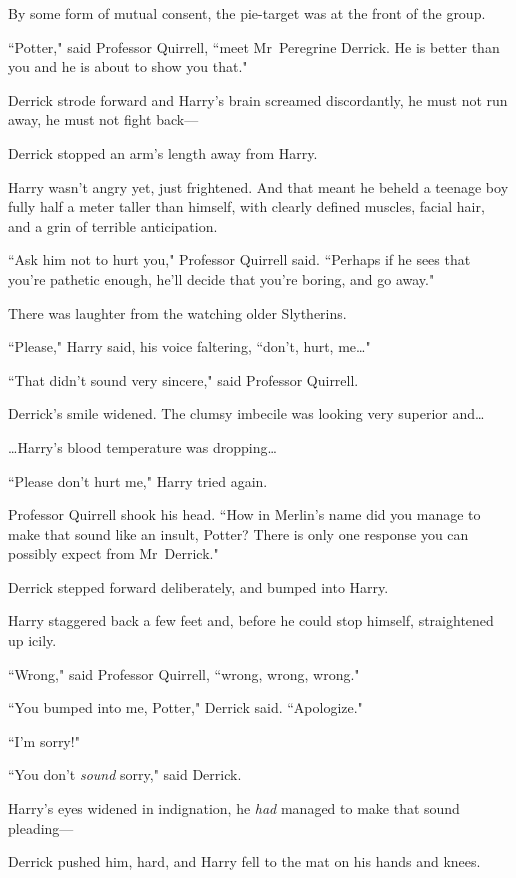 By some form of mutual consent, the pie-target was at the front of the group.

``Potter," said Professor Quirrell, ``meet Mr~Peregrine Derrick. He is better than you and he is about to show you that."

Derrick strode forward and Harry's brain screamed discordantly, he must not run away, he must not fight back—

Derrick stopped an arm's length away from Harry.

Harry wasn't angry yet, just frightened. And that meant he beheld a teenage boy fully half a meter taller than himself, with clearly defined muscles, facial hair, and a grin of terrible anticipation.

``Ask him not to hurt you," Professor Quirrell said. ``Perhaps if he sees that you're pathetic enough, he'll decide that you're boring, and go away."

There was laughter from the watching older Slytherins.

``Please," Harry said, his voice faltering, ``don't, hurt, me{\ldots}"

``That didn't sound very sincere," said Professor Quirrell.

Derrick's smile widened. The clumsy imbecile was looking very superior and{\ldots}

{\ldots}Harry's blood temperature was dropping{\ldots}

``Please don't hurt me," Harry tried again.

Professor Quirrell shook his head. ``How in Merlin's name did you manage to make that sound like an insult, Potter? There is only one response you can possibly expect from Mr~Derrick."

Derrick stepped forward deliberately, and bumped into Harry.

Harry staggered back a few feet and, before he could stop himself, straightened up icily.

``Wrong," said Professor Quirrell, ``wrong, wrong, wrong."

``You bumped into me, Potter," Derrick said. ``Apologize."

``I'm sorry!"

``You don't \emph{sound} sorry," said Derrick.

Harry's eyes widened in indignation, he \emph{had} managed to make that sound pleading—

Derrick pushed him, hard, and Harry fell to the mat on his hands and knees.

